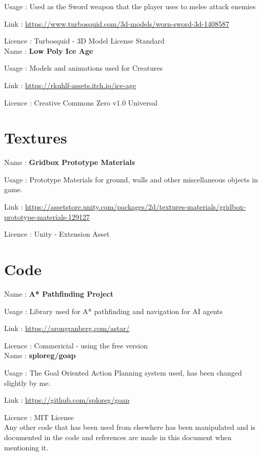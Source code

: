 \documentclass[11pt]{report}
\begin{document}
Usage : Used as the Sword weapon that the player uses to melee attack enemies

Link : \url{https://www.turbosquid.com/3d-models/worn-sword-3d-1408587}

Licence : Turbosquid - 3D Model License Standard  
\\

Name : \textbf{Low Poly Ice Age}

Usage : Models and animations used for Creatures

Link : \url{https://rkuhlf-assets.itch.io/ice-age}

Licence : Creative Commons Zero v1.0 Universal

\section{Textures}
Name : \textbf{Gridbox Prototype Materials}

Usage : Prototype Materials for ground, walls and other miscellaneous objects in game.

Link : \url{https://assetstore.unity.com/packages/2d/textures-materials/gridbox-prototype-materials-129127}

Licence : Unity - Extension Asset

\section{Code}
Name : \textbf{A* Pathfinding Project}

Usage : Library used for A* pathfinding and navigation for AI agents

Link : \url{https://arongranberg.com/astar/}

Licence : Commericial - using the free version
\\

Name : \textbf{sploreg/goap}

Usage : The Goal Oriented Action Planning system used, has been changed slightly by me.

Link : \url{https://github.com/sploreg/goap}

Licence : MIT License 
\\

Any other code that has been used from elsewhere has been manipulated and is documented in the code and references are made in this document when mentioning it.
\end{document}
